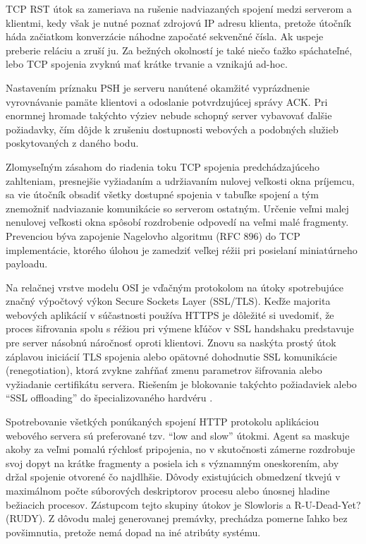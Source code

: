 \documentclass[12pt, a4paper]{article}
\begin{document}
TCP RST útok sa zameriava na rušenie nadviazaných spojení medzi serverom a klientmi, kedy však je
nutné poznať zdrojovú IP adresu klienta, pretože útočník háda začiatkom konverzácie náhodne započaté 
sekvenčné čísla. Ak uspeje preberie reláciu a zruší ju. Za bežných okolností je také niečo ťažko 
spáchateľné, lebo TCP spojenia zvyknú mať krátke trvanie a vznikajú ad-hoc.

Nastavením príznaku PSH je serveru nanútené okamžité vyprázdnenie vyrovnávanie pamäte klientovi
a odoslanie potvrdzujúcej správy ACK. Pri enormnej hromade takýchto výziev nebude schopný server
vybavovať ďalšie požiadavky, čím dôjde k zrušeniu dostupnosti webových a podobných služieb poskytovaných
z daného bodu.

Zlomyseľným zásahom do riadenia toku TCP spojenia predchádzajúceho zahlteniam, presnejšie vyžiadaním a 
udržiavaním nulovej veľkosti okna príjemcu, sa vie útočník obsadiť všetky dostupné spojenia v tabuľke
spojení a tým znemožniť nadviazanie komunikácie so serverom ostatným. Určenie veľmi malej nenulovej
veľkosti okna spôsobí rozdrobenie odpovedí na veľmi malé fragmenty. Prevenciou býva zapojenie Nagelovho
algoritmu (RFC 896) do TCP implementácie, ktorého úlohou je zamedziť veľkej réžii pri posielaní 
miniatúrneho payloadu.

Na relačnej vrstve modelu OSI je vďačným protokolom na útoky spotrebujúce značný výpočtový výkon Secure
Sockets Layer (SSL/TLS). Keďže majorita webových aplikácií v súčastnosti používa HTTPS
je dôležité si uvedomiť, že proces šifrovania spolu s réžiou pri výmene kľúčov v SSL handshaku predstavuje 
pre server násobnú náročnosť oproti klientovi. Znovu sa naskýta prostý útok záplavou iniciácií TLS spojenia
alebo opätovné dohodnutie SSL komunikácie (renegotiation), ktorá zvykne zahŕňať zmenu parametrov šifrovania
alebo vyžiadanie certifikátu servera. Riešením je blokovanie takýchto požiadaviek alebo \enquote{SSL 
offloading} do špecializovaného hardvéru \cite{csirt-ddos}.

Spotrebovanie všetkých ponúkaných spojení HTTP protokolu aplikáciou webového servera sú preferované
tzv. \enquote{low and slow} útokmi. Agent sa maskuje akoby za veľmi pomalú rýchlosť pripojenia,
no v skutočnosti zámerne rozdrobuje svoj dopyt na krátke fragmenty a posiela ich s významným oneskorením,
aby držal spojenie otvorené čo najdlhšie. Dôvody existujúcich obmedzení tkvejú v maximálnom počte 
súborových deskriptorov procesu alebo únosnej hladine bežiacich procesov. Zástupcom tejto skupiny
útokov je Slowloris a R-U-Dead-Yet? (RUDY). Z dôvodu malej generovanej premávky, prechádza pomerne ľahko 
bez povšimnutia, pretože nemá dopad na iné atribúty systému.
\end{document}
